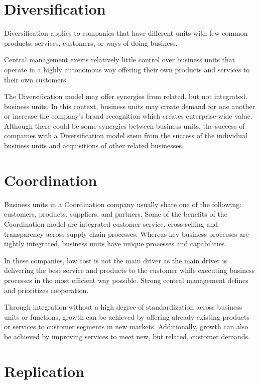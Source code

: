 \section*{Diversification}

Diversification applies to companies that have different units with few common products, services, customers,
or ways of doing business.

Central management exerts relatively little control over business units that operate in a highly autonomous way
offering their own products and services to their own customers.

The Diversification model may offer synergies from related, but not integrated, business units.
In this context, business units may create demand for one another or increase the company’s brand recognition
which creates enterprise-wide value.
Although there could be some synergies between business units, the success of companies with a Diversification model
stem from the success of the individual business units and acquisitions of other related businesses.

\section*{Coordination}

Business units in a Coordination company usually share one of the following:
customers, products, suppliers, and partners.
Some of the benefits of the Coordination model are integrated customer service,
cross-selling and transparency across supply chain processes.
Whereas key business processes are tightly integrated, business units have unique processes and capabilities.

In these companies, low cost is not the main driver as the main driver is delivering the best service and products
to the customer while executing business processes in the most efficient way possible.
Strong central management defines and prioritizes cooperation.

Through integration without a high degree of standardization across business units or functions,
growth can be achieved by offering already existing products or services to customer segments in new markets.
Additionally, growth can also be achieved by improving services to meet new, but related, customer demands.

\section*{Replication}

